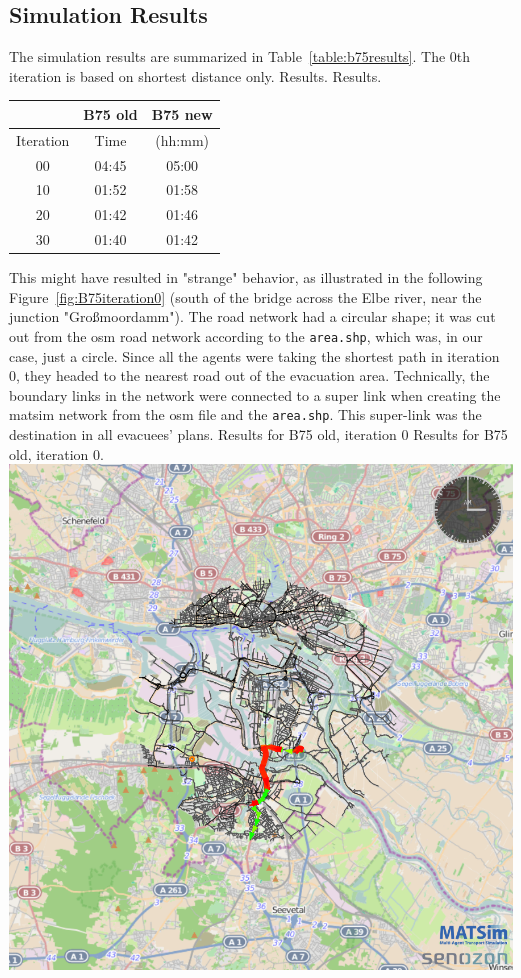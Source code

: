 \subsection{Simulation Results}
The simulation results are summarized in Table~\ref{table:b75results}. The 0th iteration is based on shortest distance only. 
%
\createtable%
{Results.}%
{Results.}%
{\label{table:b75results}}%
{%
\begin{tabular}{|c|c|c|}
	\hline \rule[-2ex]{0pt}{5.5ex}  & B75 old & B75 new \\ 
	\hline \rule[-2ex]{0pt}{5.5ex}  Iteration & Time &  (hh:mm) \\ 
	\hline \rule[-2ex]{0pt}{5.5ex}  00 & 04:45 &  05:00\\ 
	\hline \rule[-2ex]{0pt}{5.5ex}  10 & 01:52 &  01:58\\ 
	\hline \rule[-2ex]{0pt}{5.5ex}  20 & 01:42 &  01:46\\ 
	\hline \rule[-2ex]{0pt}{5.5ex}  30 & 01:40 &  01:42\\ 
	\hline 
\end{tabular}
}%
{}%
%
This might have resulted in "strange" behavior, as illustrated in the following Figure~\ref{fig:B75iteration0} (south of the bridge across the Elbe river, near the junction "Gro{\ss}moordamm"). The road network had a circular shape; it was cut out from the osm road network according to the \lstinline|area.shp|, which was, in our case, just a circle. Since all the agents were taking the shortest path in iteration 0, they headed to the nearest road out of the evacuation area. Technically, the boundary links in the network were connected to a super link when creating the \gls{matsim} network from the \gls{osm} file and the \lstinline|area.shp|. This super-link was the destination in all evacuees' plans. 
%
\createfigure%
{Results for B75 old, iteration 0}%
{Results for B75 old, iteration 0.}%
{\label{fig:B75iteration0}}%
{\includegraphics[width=0.7\linewidth]{using/figures/B75iteration0}}%

